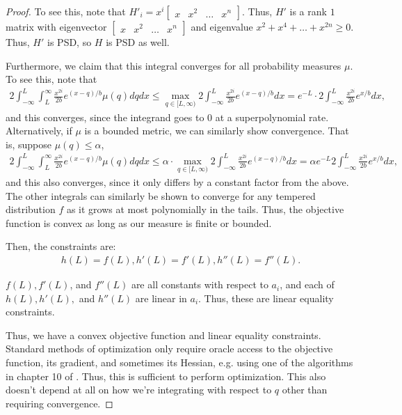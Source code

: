 \documentclass[11pt]{article}
\begin{document}
\begin{proof}
To see this, note that $H'_i = x^i \begin{bmatrix} x & x^2 & \dots & x^n \end{bmatrix}$. Thus, $H'$ is a rank $1$ matrix with eigenvector $\begin{bmatrix} x & x^2 & \dots & x^n \end{bmatrix}$ and eigenvalue $x^2+x^4+ \dots + x^{2n} \ge 0$. Thus, $H'$ is PSD, so $H$ is PSD as well.

Furthermore, we claim that this integral converges for all probability measures $\mu$. To see this, note that
\begin{align}
    2\int_{-\infty}^L \int_L^\infty \frac{x^{2i}}{2b} e^{(x-q)/b} \mu(q) dq dx \le \max_{q \in [L, \infty)} 2\int_{-\infty}^L \frac{x^{2i}}{2b} e^{(x-q)/b} dx = e^{-L} \cdot 2\int_{-\infty}^L \frac{x^{2i}}{2b} e^{x/b} dx,
\end{align}
and this converges, since the integrand goes to $0$ at a superpolynomial rate. Alternatively, if $\mu$ is a bounded metric, we can similarly show convergence. That is, suppose $\mu(q) \le \alpha$, 
\begin{align}
    2\int_{-\infty}^L \int_L^\infty \frac{x^{2i}}{2b} e^{(x-q)/b} \mu(q) dq dx \le \alpha \cdot \max_{q \in [L, \infty)} 2\int_{-\infty}^L \frac{x^{2i}}{2b} e^{(x-q)/b} dx = \alpha e^{-L} 2\int_{-\infty}^L \frac{x^{2i}}{2b} e^{x/b} dx,
\end{align}
and this also converges, since it only differs by a constant factor from the above. The other integrals can similarly be shown to converge for any tempered distribution $f$ as it grows at most polynomially in the tails. Thus, the objective function is convex as long as our measure is finite or bounded.

Then, the constraints are:
\begin{align}
    h(L) = f(L), h'(L) = f'(L), h''(L) = f''(L).
\end{align}

$f(L), f'(L)$, and $f''(L)$ are all constants with respect to $a_i$, and each of $h(L), h'(L),$ and $h''(L)$ are linear in $a_i$. Thus, these are linear equality constraints.

Thus, we have a convex objective function and linear equality constraints. Standard methods of optimization only require oracle access to the objective function, its gradient, and sometimes its Hessian, e.g. using one of the algorithms in chapter 10 of \cite{Boyd_Vandenberghe_2004}. Thus, this is sufficient to perform optimization. This also doesn't depend at all on how we're integrating with respect to $q$ other than requiring convergence.
\end{proof}
\end{document}
